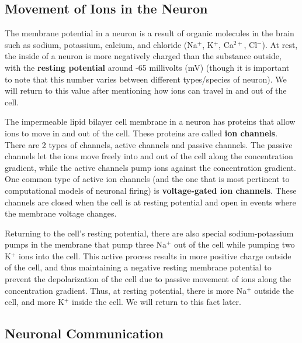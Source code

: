 \documentclass[11pt]{article}
\begin{document}
\subsection{Movement of Ions in the Neuron}
\label{sec:movement_of_ions}
The membrane potential in a neuron is a result of organic molecules in the brain such as sodium, potassium, calcium, and chloride (Na$^+$, K$^+$, Ca$^{2+}$, Cl$^-$). At rest, the inside of a neuron is more negatively charged than the substance outside, with the \textbf{resting potential} around -65 millivolts (mV) (though it is important to note that this number varies between different types/species of neuron). We will return to this value after mentioning how ions can travel in and out of the cell.

The impermeable lipid bilayer cell membrane in a neuron has proteins that allow ions to move in and out of the cell. These proteins are called \textbf{ion channels}. There are 2 types of channels, active channels and passive channels. The passive channels let the ions move freely into and out of the cell along the concentration gradient, while the active channels pump ions against the concentration gradient. One common type of active ion channels (and the one that is most pertinent to computational models of neuronal firing) is \textbf{voltage-gated ion channels}. These channels are closed when the cell is at resting potential and open in events where the membrane voltage changes.

Returning to the cell's resting potential, there are also special sodium-potassium pumps in the membrane that pump three Na$^+$ out of the cell while pumping two K$^+$ ions into the cell. This active process results in more positive charge outside of the cell, and thus maintaining a negative resting membrane potential to prevent the depolarization of the cell due to passive movement of ions along the concentration gradient. Thus, at resting potential, there is more Na$^+$ outside the cell, and more K$^+$ inside the cell. We will return to this fact later.


\subsection{Neuronal Communication}
\label{sec:neuronal_communication}
\end{document}
